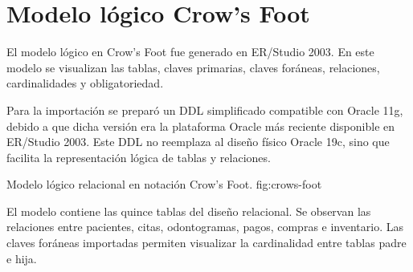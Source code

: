 \section{Modelo lógico Crow's Foot}

El modelo lógico en Crow's Foot fue generado en ER/Studio 2003. En este modelo se visualizan las tablas, claves primarias, claves foráneas, relaciones, cardinalidades y obligatoriedad.

Para la importación se preparó un DDL simplificado compatible con Oracle 11g, debido a que dicha versión era la plataforma Oracle más reciente disponible en ER/Studio 2003. Este DDL no reemplaza al diseño físico Oracle 19c, sino que facilita la representación lógica de tablas y relaciones.

{Modelo lógico relacional en notación Crow's Foot.}
{fig:crows-foot}

El modelo contiene las quince tablas del diseño relacional. Se observan las relaciones entre pacientes, citas, odontogramas, pagos, compras e inventario. Las claves foráneas importadas permiten visualizar la cardinalidad entre tablas padre e hija.
